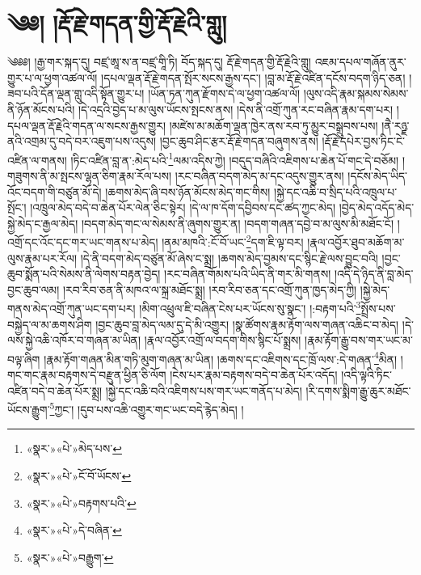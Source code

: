 \chapter{༄༅། །རྡོ་རྗེ་གདན་གྱི་རྡོ་རྗེའི་གླུ།}༄༅༅། །རྒྱ་གར་སྐད་དུ། བཛྲ་ཨཱ་ས་ན་བཛྲ་གཱི་ཏི། བོད་སྐད་དུ། རྡོ་རྗེ་གདན་གྱི་རྡོ་རྗེའི་གླུ། འཇམ་དཔལ་གཞོན་ནུར་གྱུར་པ་ལ་ཕྱག་འཚལ་ལོ། །དཔལ་ལྡན་རྡོ་རྗེ་གདན་སྤོར་སངས་རྒྱས་དང་། །བླ་མ་རྡོ་རྗེ་འཛིན་དངོས་བདག་ཉིད་ཅན། །ཟབ་པའི་དོན་ལྡན་གླུ་འདི་སྟོན་གྱུར་པ། །ཡོན་ཏན་ཀུན་རྫོགས་དེ་ལ་ཕྱག་འཚལ་ལོ། །ལུས་འདི་རྣམ་སྐམས་སེམས་ནི་ཉོན་མོངས་པའི། །དེ་འདྲའི་བྱེད་པ་མ་ལུས་ཡོངས་སྤངས་ནས། །དེས་ནི་འགྲོ་ཀུན་རང་བཞིན་རྣམ་དག་པར། །དཔལ་ལྡན་རྡོ་རྗེའི་གདན་ལ་སངས་རྒྱས་གྱུར། །མཛེས་མ་མཆོག་ལྡན་ཁྱེར་ནས་རབ་ཏུ་མྱུར་བསྒྲུབས་པས། །ནཻ་རཉྫ་ནའི་འགྲམ་དུ་བདེ་བར་འཇུག་པས་འདུས། །བྱང་ཆུབ་ཤིང་རྩར་རྡོ་རྗེ་གདན་བཞུགས་ནས། །རྡོ་རྗེ་དཔེར་བྱས་ཏིང་ངེ་འཛིན་ལ་གནས། །ཏིང་འཛིན་བླ་ན་:མེད་པའི་\footnote{«སྣར་»«པེ་»མེད་པས་}ལམ་འདིས་ཀྱེ། །བདུད་བཞིའི་འཇིགས་པ་ཆེན་པོ་གང་དེ་བཅོམ། །གཟུགས་ནི་མ་སྤངས་ལྷན་ཅིག་རྣམ་རོལ་པས། །རང་བཞིན་བདག་མེད་མ་དང་འདུས་གྱུར་ནས། །དངོས་མེད་ཡིད་འོང་བདག་གི་བཙུན་མོ་དེ། །ཆགས་མེད་ཞི་བས་ཉོན་མོངས་མེད་གང་གིས། །སྐྱེ་དང་འཆི་བ་སྲིད་པའི་འཁྲུལ་པ་སྤོང་། །འཁྲུལ་མེད་བདེ་བ་ཆེན་པོར་ལེན་ཅིང་སྟེར། །དེ་ལ་ཁ་དོག་དབྱིབས་དང་ཚད་ཀྱང་མེད། །བྱེད་མེད་འདོད་མེད་སྐྱེ་མེད་ང་རྒྱལ་མེད། །བདག་མེད་གང་ལ་སེམས་ནི་ཞུགས་གྱུར་ན། །བདག་གཞན་དབྱེ་བ་མ་ལུས་མི་མཐོང་ངོ། །འགྲོ་དང་འོང་དང་གར་ཡང་གནས་པ་མེད། །ནམ་མཁའི་:ངོ་བོ་ཡང་\footnote{«སྣར་»«པེ་»ངོ་བོ་ཡོངས་}དག་ཇི་ལྟ་བར། །རྣལ་འབྱོར་ཐུབ་མཆོག་མ་ལུས་རྣམ་པར་རོལ། །དེ་ནི་བདག་མེད་བཙུན་མོ་ཞེས་ང་སྨྲ། །ཆགས་མེད་བྱམས་དང་སྙིང་རྗེ་ལས་བྱུང་བའི། །བྱང་ཆུབ་སྨོན་པའི་སེམས་ནི་ལེགས་བརྟན་བྱེད། །རང་བཞིན་གོམས་པའི་ཡིད་ནི་གར་མི་གནས། །འདི་དེ་ཉིད་ནི་བླ་མེད་བྱང་ཆུབ་ལམ། །རབ་རིབ་ཅན་ནི་མཁའ་ལ་སྐྲ་མཐོང་སྨྲ། །རབ་རིབ་ཅན་དང་འགྲོ་ཀུན་ཁྱད་མེད་ཀྱི། །སྐྱེ་མེད་གནས་མེད་འགྲོ་ཀུན་ཡང་དག་པར། །མིག་འཕྲུལ་ཇི་བཞིན་ངེས་པར་ཡོངས་སུ་སྣང་། །:བརྟག་པའི་\footnote{«སྣར་»«པེ་»བརྟགས་པའི་}སྤྲོས་པས་བསྐྱེད་ལ་མ་ཆགས་ཤིག །བྱང་ཆུབ་བླ་མེད་ལམ་དུ་དེ་མི་འགྱུར། །སྣ་ཚོགས་རྣམ་རྟོག་ལས་གཞན་འཆིང་བ་མེད། །དེ་ལས་སྐྱེ་འཆི་འཁོར་བ་གཞན་མ་ཡིན། །རྣལ་འབྱོར་འགྲོ་ལ་བདག་གིས་སྙིང་པོ་སྨྲས། །རྣམ་རྟོག་རྒྱུ་བས་གར་ཡང་མ་བལྟ་ཞིག །རྣམ་རྟོག་གཞན་མིན་གཏི་མུག་གཞན་མ་ཡིན། །ཆགས་དང་འཇིགས་དང་ཁྲོ་ལས་:དེ་གཞན་\footnote{«སྣར་»«པེ་»དེ་བཞིན་}མིན། །གང་གང་རྣམ་བརྟགས་དེ་བརྫུན་ཕྱིན་ཅི་ལོག །ངེས་པར་རྣམ་བརྟགས་བདེ་བ་ཆེན་པོར་འདོད། །འདི་ལྟའི་ཏིང་འཛིན་བདེ་བ་ཆེན་པོར་སྨྲ། །སྐྱེ་དང་འཆི་བའི་འཇིགས་པས་གར་ཡང་གནོད་པ་མེད། །རི་དགས་སྨིག་རྒྱུ་ཆུར་མཐོང་ཡོངས་རྒྱུག་\footnote{«སྣར་»«པེ་»བརྒྱུག་}ཀྱང་། །དུབ་པས་འཆི་འགྱུར་གང་ཡང་བདེ་རྙེད་མེད། །

